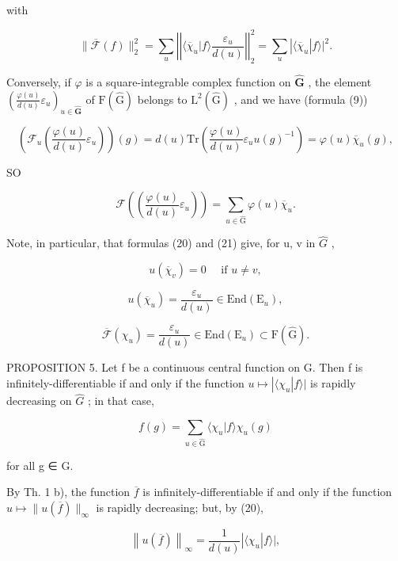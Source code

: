with

\[
\| \overline {{\mathcal {F}}} (f) \| _ {2} ^ {2} = \sum_ {u} \left| \left| \langle \overline {{\chi}} _ {u} | f \rangle \frac {\varepsilon_ {u}}{d (u)} \right| \right| _ {2} ^ {2} = \sum_ {u} | \langle \overline {{\chi}} _ {u} | f \rangle | ^ {2}.
\]

Conversely, if \(\varphi\) is a square-integrable complex function on \(\hat{\mathbf{G}}\) , the element \(\left(\frac{\varphi(u)}{d(u)}\varepsilon_u\right)_{u\in \hat{\mathbf{G}}}\) of \(\mathrm{F}(\hat{\mathrm{G}})\) belongs to \(\mathrm{L}^2 (\hat{\mathrm{G}})\) , and we have (formula (9))

\[
\left(\mathcal {F} _ {u} \left(\frac {\varphi (u)}{d (u)} \varepsilon_ {u}\right)\right) (g) = d (u) \mathrm{Tr} \left(\frac {\varphi (u)}{d (u)} \varepsilon_ {u} u (g) ^ {- 1}\right) = \varphi (u) \overline {{\chi}} _ {u} (g),
\]

SO

\[
\mathcal {F} \left(\left(\frac {\varphi (u)}{d (u)} \varepsilon_ {u}\right)\right) = \sum_ {u \in \hat {\mathrm{G}}} \varphi (u) \overline {{\chi}} _ {u}.\tag{22}
\]

Note, in particular, that formulas (20) and (21) give, for u, v in \(\hat{G}\) ,

\[
u (\overline {{\chi}} _ {v}) = 0 \quad \text { if } u \neq v,\tag{23}
\]

\[
u (\overline {{\chi}} _ {u}) = \frac {\varepsilon_ {u}}{d (u)} \in \mathrm{End} (\mathrm{E} _ {u}),\tag{24}
\]

\[
\overline {{\mathcal {F}}} (\chi_ {u}) = \frac {\varepsilon_ {u}}{d (u)} \in \mathrm{End} (\mathrm{E} _ {u}) \subset \mathrm{F} (\hat {\mathrm{G}}).\tag{25}
\]

PROPOSITION 5. Let f be a continuous central function on G. Then f is infinitely-differentiable if and only if the function \(u \mapsto |\langle \chi_{u}|f\rangle|\) is rapidly decreasing on \(\hat{G}\) ; in that case,

\[
f (g) = \sum_ {u \in \hat {\mathrm{G}}} \langle \chi_ {u} | f \rangle \chi_ {u} (g)
\]

for all g ∈ G.

By Th. 1 b), the function \(\overline{f}\) is infinitely-differentiable if and only if the function \(u \mapsto \| u(\overline{f})\|_{\infty}\) is rapidly decreasing; but, by (20),

\[
\left\| u (\overline {{f}}) \right\| _ {\infty} = \frac {1}{d (u)} | \langle \chi_ {u} | f \rangle |,
\]

